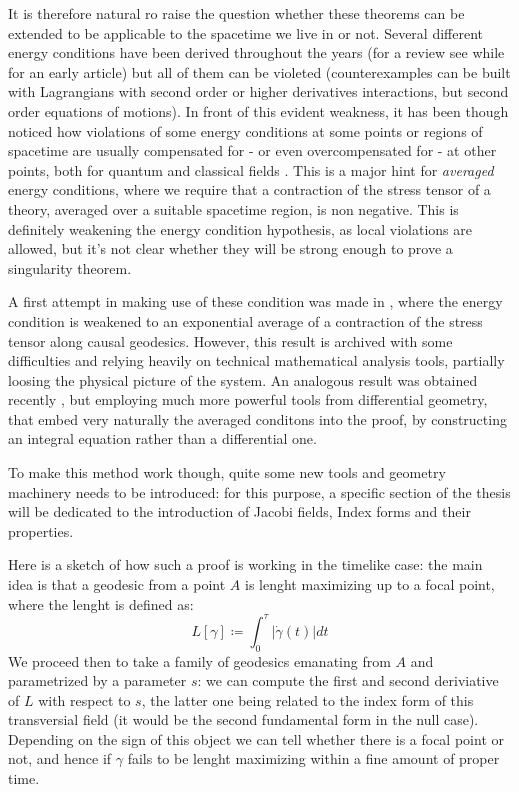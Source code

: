 \documentclass[12pt, a4paper]{article}
\begin{document}
It is therefore natural ro raise the question whether these theorems can be extended to be applicable to the spacetime we live in or not.
Several different energy conditions have been derived throughout the years (for a review see \cite{kontou2020energy} while \cite{tipler1978energy} for an early article)
but all of them can be violeted (counterexamples can be built with Lagrangians with second order or higher derivatives interactions, but second order equations of motions).
In front of this evident weakness, it has been though noticed how violations of some energy conditions at some points or regions of spacetime are usually compensated for - or even overcompensated for - at other points, both for quantum and classical fields \cite{ford1999quantum}.
This is a major hint for \emph{averaged} energy conditions, where we require that a contraction of the stress tensor of a theory, averaged over a suitable spacetime region, is non negative.
This is definitely weakening the energy condition hypothesis, as local violations are allowed, but it's not clear whether they will be strong enough to prove a singularity theorem.

A first attempt in making use of these condition was made in \cite{fewster2011singularity},
where the energy condition is weakened to an exponential average of a contraction of the stress tensor along causal geodesics.
However, this result is archived with some difficulties and relying heavily on technical mathematical analysis tools, partially loosing the physical picture of the system.
An analogous result was obtained recently \cite{fewster2020new}, but employing much more powerful tools from differential geometry, that embed very naturally the averaged conditons into the proof, by constructing an integral equation rather than a differential one.

To make this method work though, quite some new tools and geometry machinery needs to be introduced: for this purpose, a specific section of the thesis will be dedicated to the introduction of Jacobi fields, Index forms and their properties.

Here is a sketch of how such a proof is working in the timelike case: the main idea is that a geodesic from a point \( A\) is lenght maximizing up to a focal point, where the lenght is defined as:
\[
L[\gamma] \coloneqq \int_{0}^{\tau} |\dot{\gamma}(t) |dt
\]
We proceed then to take a family of geodesics emanating from \(A\) and parametrized by a parameter \(s\): we can compute the first and second deriviative of \(L\) with respect to \(s\), the latter one being related to the index form of this transversial field (it would be the second fundamental form in the null case).
Depending on the sign of this object we can tell whether there is a focal point or not, and hence if \(\gamma\) fails to be lenght maximizing within a fine amount of proper time.
\end{document}
